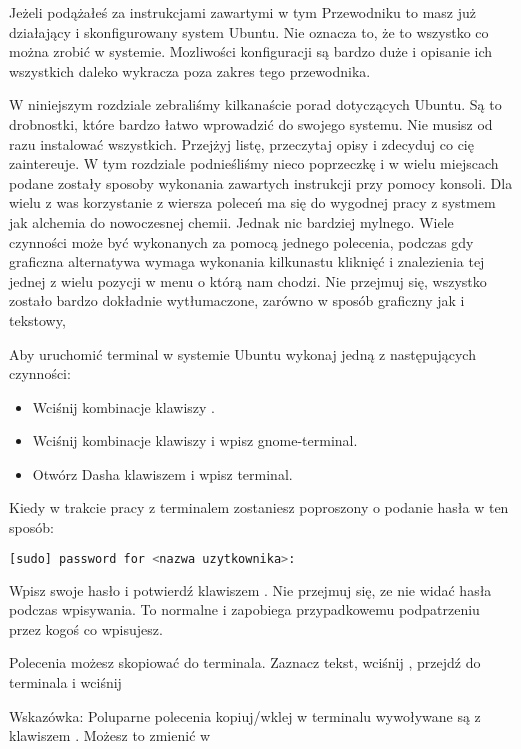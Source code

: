 Jeżeli podążałeś za instrukcjami zawartymi w tym Przewodniku to masz już działający i skonfigurowany system Ubuntu. Nie oznacza to, że to wszystko co można zrobić w systemie. Mozliwości konfiguracji są bardzo duże i opisanie ich wszystkich daleko wykracza poza zakres tego przewodnika.

W niniejszym rozdziale zebraliśmy kilkanaście porad dotyczących Ubuntu. Są to drobnostki, które bardzo łatwo wprowadzić do swojego systemu. Nie musisz od razu instalować wszystkich. Przejżyj listę, przeczytaj opisy i zdecyduj co cię zaintereuje. W tym rozdziale podnieśliśmy nieco poprzeczkę i w wielu miejscach podane zostały sposoby wykonania zawartych instrukcji przy pomocy konsoli. Dla wielu z was korzystanie z wiersza poleceń ma się do wygodnej pracy z systmem jak alchemia do nowoczesnej chemii. Jednak nic bardziej mylnego. Wiele czynności może być wykonanych za pomocą jednego polecenia, podczas gdy graficzna alternatywa wymaga wykonania kilkunastu kliknięć i znalezienia tej jednej z wielu pozycji w menu o którą nam chodzi. Nie przejmuj się, wszystko zostało bardzo dokładnie wytłumaczone, zarówno w sposób graficzny jak i tekstowy,

Aby uruchomić terminal w systemie Ubuntu wykonaj jedną z następujących czynności:
\begin{itemize}
\item Wciśnij kombinacje klawiszy .
\item Wciśnij kombinacje klawiszy  i wpisz \textcolor{ubuntu_orange}{gnome-terminal}.
\item Otwórz Dasha klawiszem  i wpisz \textcolor{ubuntu_orange}{terminal}.
\end{itemize}

Kiedy w trakcie pracy z terminalem zostaniesz poproszony o podanie hasła w ten sposób:
\begin{lstlisting}[language=bash]
[sudo] password for <nazwa uzytkownika>:
\end{lstlisting}
\noindent Wpisz swoje hasło i potwierdź klawiszem \keys{\returnwin}. Nie przejmuj się, ze nie widać hasła podczas wpisywania. To normalne i zapobiega przypadkowemu podpatrzeniu przez kogoś co wpisujesz.

Polecenia możesz skopiować do terminala. Zaznacz tekst, wciśnij , przejdź do terminala i wciśnij 

Wskazówka: Poluparne polecenia kopiuj/wklej w terminalu wywoływane są z klawiszem . Możesz to zmienić w 